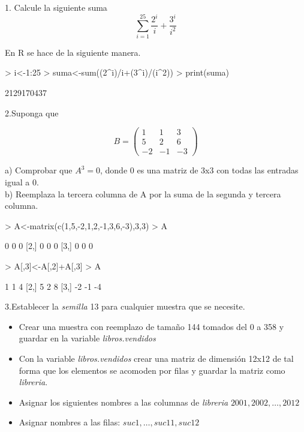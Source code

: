 \documentclass{article}
\begin{document}


1. Calcule la siguiente suma
$$\sum_{i=1}^{25} \frac{2^i}{i} + \frac{3^i}{i^2}$$

En R se hace de la siguiente manera.

\begin{Schunk}
\begin{Sinput}
> i<-1:25
> suma<-sum((2^i)/i+(3^i)/(i^2))
> print(suma)
\end{Sinput}
\begin{Soutput}
[1] 2129170437
\end{Soutput}
\end{Schunk}

2.Suponga que 

\[
B = \left( 
\begin{array}{ccc}
	1 & 1 & 3 \\
	5 & 2 & 6 \\
	-2 & -1 & -3
\end{array}
\right)
\]

a) Comprobar que $A^3=0$, donde 0 es una matriz de 3x3 con todas las entradas igual a 0.\\
b) Reemplaza la tercera columna de A por la suma de la segunda y tercera columna.

\begin{Schunk}
\begin{Sinput}
> A<-matrix(c(1,5,-2,1,2,-1,3,6,-3),3,3)
> A%*%A%*%A
\end{Sinput}
\begin{Soutput}
     [,1] [,2] [,3]
[1,]    0    0    0
[2,]    0    0    0
[3,]    0    0    0
\end{Soutput}
\begin{Sinput}
> A[,3]<-A[,2]+A[,3]
> A
\end{Sinput}
\begin{Soutput}
     [,1] [,2] [,3]
[1,]    1    1    4
[2,]    5    2    8
[3,]   -2   -1   -4
\end{Soutput}
\end{Schunk}

3.Establecer la \emph{semilla} 13 para cualquier muestra que se necesite.
  \begin{itemize}
  \item Crear una muestra con reemplazo de tamaño 144 tomados del 0 a 358 y guardar en la variable \emph{libros.vendidos}
  \item Con la variable \emph{libros.vendidos} crear una matriz de dimensión 12x12 de tal forma que los elementos se acomoden por filas y guardar la matriz como \emph{libreria}.
  \item Asignar los siguientes nombres a las columnas de \emph{libreria} $2001,2002, \hdots, 2012$
  \item Asignar nombres a las filas: $suc1,\hdots, suc11, suc12$
  
  \end{itemize}
\end{document}
